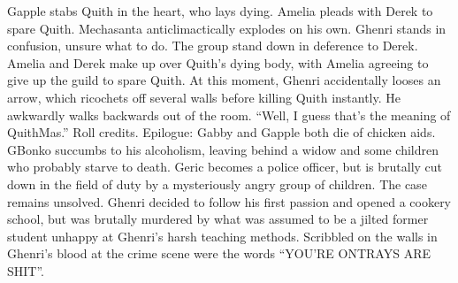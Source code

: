Gapple stabs Quith in the heart, who lays dying. Amelia pleads with Derek to spare Quith. Mechasanta anticlimactically explodes on his own. Ghenri stands in confusion, unsure what to do. The group stand down in deference to Derek.\medskip
Amelia and Derek make up over Quith’s dying body, with Amelia agreeing to give up the guild to spare Quith. At this moment, Ghenri accidentally looses an arrow, which ricochets off several walls before killing Quith instantly. He awkwardly walks backwards out of the room. “Well, I guess that’s the meaning of QuithMas.”\medskip
Roll credits.\medskip
Epilogue: Gabby and Gapple both die of chicken aids. GBonko succumbs to his alcoholism, leaving behind a widow and some children who probably starve to death. Geric becomes a police officer, but is brutally cut down in the field of duty by a mysteriously angry group of children. The case remains unsolved. Ghenri decided to follow his first passion and opened a cookery school, but was brutally murdered by what was assumed to be a jilted former student unhappy at Ghenri’s harsh teaching methods. Scribbled on the walls in Ghenri’s blood at the crime scene were the words “YOU’RE ONTRAYS ARE SHIT”.
